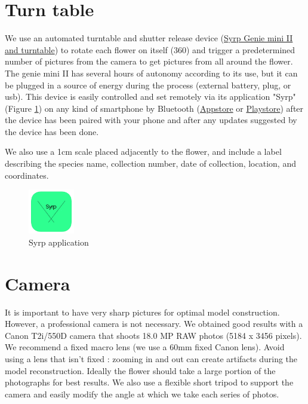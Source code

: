 \documentclass[
]{book}
\theoremstyle{definition}
\theoremstyle{definition}
\theoremstyle{definition}
\theoremstyle{definition}
\theoremstyle{remark}
\begin{document}
\hypertarget{turn-table}{%
\section{Turn table}\label{turn-table}}

We use an automated turntable and shutter release device (\href{https://www.bhphotovideo.com/c/product/1486043-REG/syrp_sykit_0043_genie_mini_ii_turntable.html/quick-compare}{Syrp Genie
mini II and
turntable})
to rotate each flower on itself (360) and trigger a predetermined number
of pictures from the camera to get pictures from all around the flower.
The genie mini II has several hours of autonomy according to its use,
but it can be plugged in a source of energy during the process (external
battery, plug, or usb). This device is easily controlled and set
remotely via its application "Syrp" (Figure
\protect\hyperlink{fig:syrp_app}{1}) on
any kind of smartphone by Bluetooth
(\href{https://apps.apple.com/us/app/syrp/id1387335063}{Appstore} or
\href{https://play.google.com/store/apps/details?id=nz.co.syrp.genie2\&hl=fr_CA\&gl=US}{Playstore})
after the device has been paired with your phone and after any updates
suggested by the device has been done.

We also use a 1cm scale placed adjacently to the flower, and include a
label describing the species name, collection number, date of
collection, location, and coordinates.

\begin{figure}
\hypertarget{fig:syrp_app}{%
\centering
\includegraphics[width=2cm,height=\textheight]{Figures/Syrp_app.png}
\caption{Syrp application}\label{fig:syrp_app}
}
\end{figure}

\hypertarget{camera}{%
\section{Camera}\label{camera}}

It is important to have very sharp pictures for optimal model
construction. However, a professional camera is not necessary. We
obtained good results with a Canon T2i/550D camera that shoots 18.0 MP
RAW photos (5184 x 3456 pixels). We recommend a fixed macro lens (we use
a 60mm fixed Canon lens). Avoid using a lens that isn't fixed : zooming
in and out can create artifacts during the model reconstruction. Ideally
the flower should take a large portion of the photographs for best
results. We also use a flexible short tripod to support the camera and
easily modify the angle at which we take each series of photos.
\end{document}

